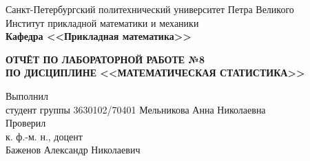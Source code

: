 \documentclass[main.tex]{subfiles}
\begin{document}
\begin{titlepage}
\begin{center}
	\begin{large}
		Санкт-Петербургский политехнический университет Петра Великого\\
		Институт прикладной математики и механики\\
		\textbf{Кафедра <<Прикладная математика>>}\\
	\end{large}
	\vfill
	\Large{\textbf{ОТЧЁТ ПО ЛАБОРАТОРНОЙ РАБОТЕ №8 \\
	ПО ДИСЦИПЛИНЕ <<МАТЕМАТИЧЕСКАЯ СТАТИСТИКА>>}}
\end{center}
\vfill
\flushleft
Выполнил\\
студент группы 3630102/70401
\flushright
Мельникова Анна Николаевна\\
\flushleft
Проверил\\
к. ф.-м. н., доцент\\
\flushright
Баженов Александр Николаевич
\vfill
{}
\end{titlepage}
\end{document}
